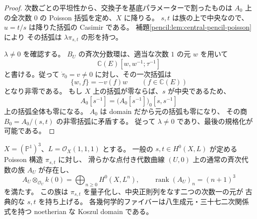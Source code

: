\begin{proof}
次数ごとの平坦性から、交換子を基底パラメーターで割ったものは
$A_0$ 上の全次数 $0$ の Poisson 括弧を定め、$X$ に降りる。
$s,t$ は族の上で中央なので、$u=t/s$ は降りた括弧の Casimir である。
補題\ref{pencil:lem:central-pencil-poisson}により
その括弧は $\lambda\pi_{s,t}$ の形を持つ。

$\lambda\ne0$ を確認する。
$B_U$ の斉次分数環は、適当な次数 $1$ の元 $w$ を用いて
\[
 \mathbb C(E)[w,w^{-1};\tau^{-1}]
\]
と書ける。従って $\dot\tau_0=v\ne0$ に対し、その一次括弧は
\[
 \{w,f\}=-v(f)w\qquad(f\in\mathbb C(E))
\]
となり非零である。
もし $X$ 上の括弧が零ならば、$s$ が中央であるため、
\[
 A_0[s^{-1}]
 =\bigl(A_0[s^{-1}]\bigr)_0[s,s^{-1}]
\]
上の括弧全体も零になる。
$A_0$ は domain だから元の括弧も零になり、
その商 $B_0=A_0/(s,t)$ の非零括弧に矛盾する。
従って $\lambda\ne0$ であり、最後の規格化が可能である。
\end{proof}

\begin{theorem}\label{pencil:thm:native-segre}
$X=(\mathbb P^1)^3$、$L=\mathcal O_X(1,1,1)$ とする。
一般の $s,t\in H^0(X,L)$ が定める Poisson 構造 $\pi_{s,t}$ に対し、
滑らかな点付き代数曲線 $(U,0)$ 上の通常の斉次代数の族 $A_U$ が存在し、
\[
 A_U\otimes_{\mathcal O_U}k(0)=\bigoplus_{n\geq0}H^0(X,L^n),
 \qquad \operatorname{rank}(A_U)_n=(n+1)^3
\]
を満たす。
この族は $\pi_{s,t}$ を量子化し、中央正則列をなす二つの次数一の元が
古典的な $s,t$ を持ち上げる。
各幾何学的ファイバーは八生成元・三十七二次関係式を持つ
noetherian な Koszul domain である。
\end{theorem}

